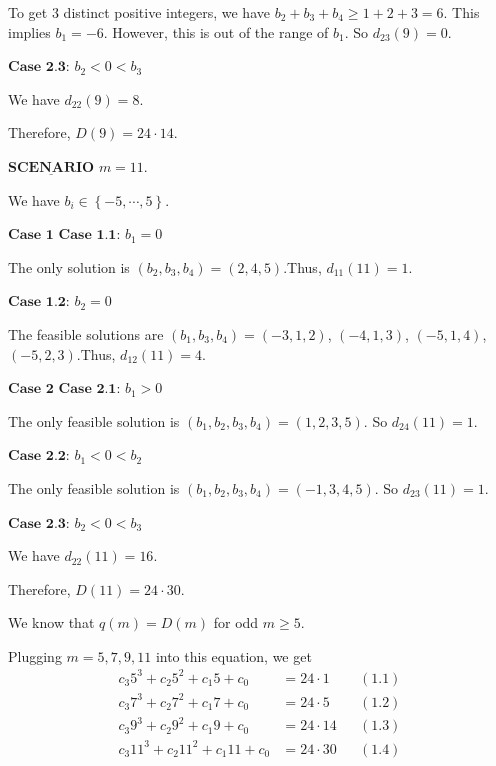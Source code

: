 \begin{enumerate}
 To get $3$ distinct positive integers, we have $b_2 + b_3 + b_4 \geq 1 + 2 + 3 = 6$. This implies $b_1 = - 6$. However, this is out of the range of $b_1$. So $d_{23} \left( 9 \right) = 0$.

 $\textbf{Case 2.3}$: $b_2 < 0 < b_3$

 We have $d_{22} \left( 9 \right) = 8$.

 Therefore, $D \left( 9 \right) = 24 \cdot 14$.

 
$\underline{\textbf{SCENARIO}}$ $m = 11$.

 We have $b_i \in \left\{ - 5 , \cdots , 5 \right\}$.

 $\textbf{Case 1}$
$\textbf{Case 1.1}$: $b_1 = 0$

 The only solution is $\left( b_2 , b_3 , b_4 \right) = \left(  2, 4, 5 \right)$.Thus, $d_{11} \left( 11 \right) = 1$.

 $\textbf{Case 1.2}$: $b_2 = 0$

 The feasible solutions are $\left( b_1 , b_3 , b_4 \right) = \left( - 3 , 1 , 2 \right)$, $\left( - 4 , 1 , 3 \right)$, $\left( - 5 , 1 , 4 \right)$, $\left( - 5 , 2 , 3 \right)$.Thus, $d_{12} \left( 11 \right) = 4$.

 $\textbf{Case 2}$
$\textbf{Case 2.1}$: $b_1 > 0$

 The only feasible solution is $\left( b_1 , b_2 , b_3 , b_4 \right) = \left(  1 , 2, 3, 5 \right)$. So $d_{24} \left( 11 \right) = 1$.

 $\textbf{Case 2.2}$: $b_1 < 0 < b_2$

 The only feasible solution is $\left( b_1 , b_2 , b_3 , b_4 \right) = \left(  -1 , 3, 4, 5 \right)$.  So $d_{23} \left( 11 \right) = 1$.

 $\textbf{Case 2.3}$: $b_2 < 0 < b_3$

 We have $d_{22} \left( 11 \right) = 16$.

 Therefore, $D \left( 11 \right) = 24 \cdot 30$.

 We know that $q \left( m \right) = D \left( m \right)$ for odd $m \geq 5$.

 Plugging $m = 5, 7, 9, 11$ into this equation, we get
 \begin{align*} c_3 5^3 + c_2 5^2 + c_1 5 + c_0 & = 24 \cdot 1 && (1.1) \\ c_3 7^3 + c_2 7^2 + c_1 7 + c_0 & = 24 \cdot 5 && (1.2) \\ c_3 9^3 + c_2 9^2 + c_1 9 + c_0 & = 24 \cdot 14 && (1.3) \\ c_3 11^3 + c_2 11^2 + c_1 11 + c_0 & = 24 \cdot 30 && (1.4) \end{align*}



\end{enumerate}
